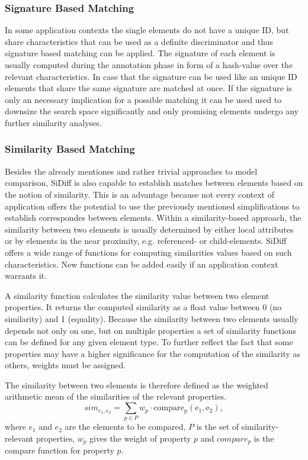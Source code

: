 \documentclass{article}
\begin{document}
\subsubsection{Signature Based Matching}
In some application contexts the single elements do not have a unique ID, but share characteristics 
that can be used as a definite discriminator and thus signature based matching can be applied. The signature of each element is 
usually computed during the annotation phase in form of a hash-value over the relevant characteristics. In case that  
the signature can be used like an unique ID elements that share the same signature are matched at once. If the signature 
is only an necessary implication for a possible matching it can be used used to downsize the search space significantly 
and only promising elements undergo any further similarity analyses.

\subsubsection{Similarity Based Matching}
Besides the already mentiones and rather trivial approaches to model comparison, SiDiff is also capable to establish matches between elements 
based on the notion of similarity. This is an advantage because not every context of application offers the potential to use the previously 
mentioned simplifications to establish correspondes between elements. Within a similarity-based approach, the similarity between two elements is 
usually determined by either local attributes or by elements in the near proximity, e.g. referenced- or child-elements. SiDiff offers a 
wide range of functions for computing similarities values based on such characteristics. New functions can be added easily if an application context 
warrants it.

A similarity function calculates the similarity value between two element properties. It returns the computed similarity as a 
float value between 0 (no similarity) and 1 (equality). Because the similarity between two elements usually depends not only on one, but on 
multiple properties a set of similarity functions can be defined for any given element type. To further reflect the fact that some properties may have a higher 
significance for the computation of the similarity as others, weights must be assigned.

The similarity between two elements is therefore defined as the weighted arithmetic mean of the
similarities of the relevant properties. 
\[ sim_{e_1,e_2} = \sum_{p \in P} w_p \cdot \mathrm{compare_p(e_1, e_2)}, \]
where $e_1$ and $e_2$ are the elements to be compared, $P$ is the set of
similarity-relevant properties, $w_p$ gives the weight of property $p$ and
$compare_p$ is the compare function for property $p$. 
\end{document}
